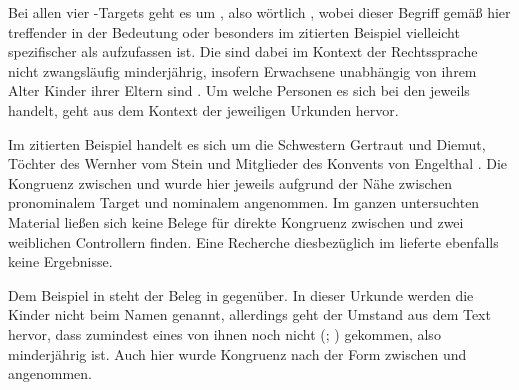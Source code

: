 Bei allen vier -Targets geht es um , also wörtlich
, wobei dieser Begriff gemäß
\citet[s.\,v.~]{lexer:mhdhwb} hier treffender in der Bedeutung
oder besonders im zitierten Beispiel vielleicht spezifischer als
aufzufassen ist. Die  sind dabei im Kontext der Rechtssprache nicht
zwangsläufig minderjährig, insofern Erwachsene unabhängig von ihrem Alter
Kinder ihrer Eltern sind \autocites[vgl.][1736]{schwab2012}[siehe
auch][258--259]{birkenesfleischer2022}. Um welche Personen es sich bei den
 jeweils handelt, geht aus dem Kontext der jeweiligen Urkunden
hervor.

Im zitierten Beispiel handelt es sich um
die Schwestern Gertraut und Diemut, Töchter des Wernher vom Stein und
Mitglieder des Konvents von Engelthal \autocite[Kr.~Nürnberger Land;
vgl.][619]{caor}. Die Kongruenz zwischen   und 
 wurde hier jeweils aufgrund der Nähe zwischen pronominalem Target
und nominalem  angenommen. Im ganzen unter\-suchten Material
ließen sich keine Belege für direkte Kongruenz zwischen  und zwei
weiblichen Controllern finden. Eine Recherche diesbezüglich im \REM{} lieferte
ebenfalls keine Ergeb\-nisse.

Dem Beispiel in  steht der Beleg in
 gegenüber. In dieser Urkunde werden die Kinder
nicht beim Namen genannt, allerdings geht der Umstand aus dem Text hervor, dass
zumindest eines von ihnen noch nicht  
(\cites(Nr.~214)[218,18--19]{cao1}; \cite[vgl.][26]{caor}) gekommen, also
minderjährig ist. Auch hier wurde Kongruenz nach der Form zwischen
  und   angenommen.

\begin{exe}
\end{exe}

